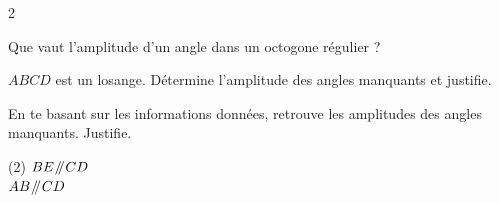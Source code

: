 \documentclass[../math2.tex]{subfiles}
\begin{document}
\begin{multicols}{2}
    \begin{exercise}
        Que vaut l'amplitude d'un angle dans un octogone régulier ?
    \end{exercise}
    \columnbreak

    \begin{exercise}
        $ABCD$ est un losange. Détermine l'amplitude des angles manquants et justifie.
        \begin{center}
            
        \end{center}
    \end{exercise}
\end{multicols}
\setlength{\columnsep}{10pt}



\begin{exercise}
    En te basant sur les informations données, retrouve les amplitudes des angles manquants. Justifie.
    \begin{tasks}(2)
        \task $BE\mathbin{\!/\mkern-5mu/\!} CD$\\
        
        \task $AB\mathbin{\!/\mkern-5mu/\!} CD$\\
        
    \end{tasks}
\end{exercise}
\end{document}
